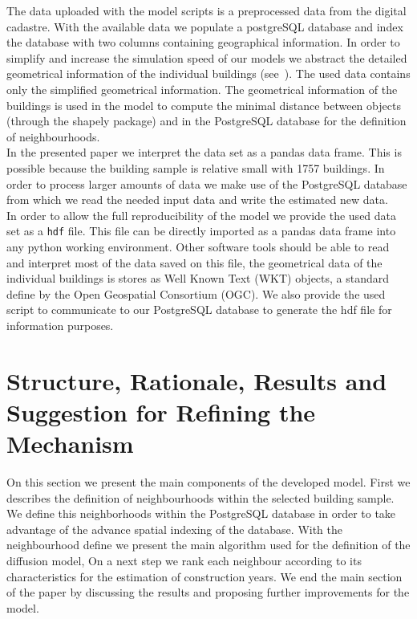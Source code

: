 The data uploaded with the model scripts is a preprocessed data from the
digital cadastre. With the available data we populate a postgreSQL database and
index the database with two columns containing geographical information. In
order to simplify and increase the simulation speed of our models we abstract
the detailed geometrical information of the individual buildings
(see~\cite{MunozH.2015.MEQ}). The used data contains only the simplified
geometrical information. The geometrical information of the buildings is used
in the model to compute the minimal distance between objects (through the
shapely package) and in the PostgreSQL database for the definition of
neighbourhoods.\\ 

In the presented paper we interpret the data set as a pandas data frame. This
is possible because the building sample is relative small with 1757 buildings.
In order to process larger amounts of data we make use of the PostgreSQL
database from which we read the needed input data and write the estimated new
data.\\

In order to allow the full reproducibility of the model we provide the used
data set as a \verb|hdf| file. This file can be directly imported as a pandas
data frame into any python working environment. Other software tools should be
able to read and interpret most of the data saved on this file, the
geometrical data of the individual buildings is stores as Well Known Text (WKT)
objects, a standard define by the Open Geospatial Consortium (OGC).
We also provide the used script to communicate to our PostgreSQL database to
generate the hdf file for information purposes.\\

\section{Structure, Rationale, Results and Suggestion for Refining the
Mechanism}

On this section we present the main components of the developed model. First we
describes the definition of neighbourhoods within the selected building sample.
We define this neighborhoods within the PostgreSQL database in order to take
advantage of the advance spatial indexing of the database. With the
neighbourhood define we present the main algorithm used for the definition of
the diffusion model, On a next step we rank each neighbour according to its
characteristics for the estimation of construction years. We end the main
section of the paper by discussing the results and proposing further
improvements for the model.\\ 

